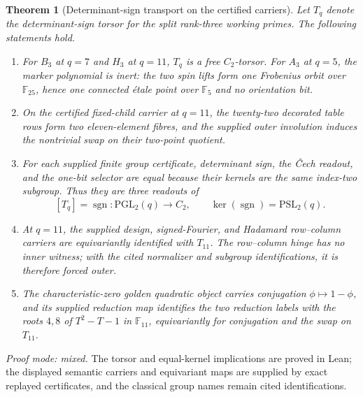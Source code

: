 \documentclass[11pt]{article}
\newtheorem{theorem}{Theorem}[section]
\theoremstyle{definition}
\theoremstyle{remark}
\newcommand{\F}{\mathbb{F}}
\begin{document}
\begin{theorem}[Determinant-sign transport on the certified carriers]
\label{thm:torsor-rosetta-close}
Let $T_q$ denote the determinant-sign torsor for the split rank-three
working primes.  The following statements hold.
\begin{enumerate}[label=\textup{(E\arabic*)},leftmargin=*]
\item For $B_3$ at $q=7$ and $H_3$ at $q=11$, $T_q$ is a free
$C_2$-torsor.  For $A_3$ at $q=5$, the marker polynomial is inert: the two
spin lifts form one Frobenius orbit over $\F_{25}$, hence one connected
étale point over $\F_5$ and no orientation bit.
\item On the certified fixed-child carrier at $q=11$, the twenty-two
decorated table rows form two eleven-element fibres, and the supplied outer
involution induces the nontrivial swap on their two-point quotient.
\item For each supplied finite group certificate, determinant sign, the
\v{C}ech readout, and the one-bit selector are equal because their kernels
are the same index-two subgroup.  Thus they are three readouts of
\[
 [T_q]=\operatorname{sgn}\colon\mathrm{PGL}_2(q)\longrightarrow C_2,
 \qquad \ker(\operatorname{sgn})=\mathrm{PSL}_2(q).
\]
\item At $q=11$, the supplied design, signed-Fourier, and Hadamard
row--column carriers are equivariantly identified with $T_{11}$.  The
row--column hinge has no inner witness; with the cited normalizer and
subgroup identifications, it is therefore forced outer.
\item The characteristic-zero golden quadratic object carries conjugation
$\phi\mapsto1-\phi$, and its supplied reduction map identifies the two
reduction labels with the roots $4,8$ of $T^2-T-1$ in $\F_{11}$,
equivariantly for conjugation and the swap on $T_{11}$.
\end{enumerate}
\end{theorem}
\noindent\emph{Proof mode: mixed.}  The torsor and equal-kernel
implications are proved in Lean; the displayed semantic carriers and
equivariant maps are supplied by exact replayed certificates, and the
classical group names remain cited identifications.
\end{document}
